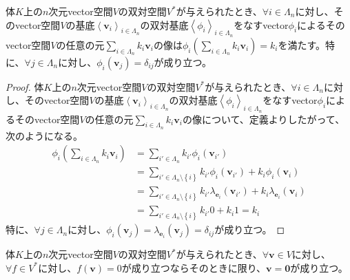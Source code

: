 \documentclass[dvipdfmx]{jsarticle}
\begin{document}
\begin{thm}\label{2.4.2.6}
体$K$上の$n$次元vector空間$V$の双対空間$V^{*}$が与えられたとき、$\forall i \in \varLambda_{n}$に対し、そのvector空間$V$の基底$\left\langle \mathbf{v}_{i} \right\rangle_{i \in \varLambda_{n}}$の双対基底$\left\langle \phi_{i} \right\rangle_{i \in \varLambda_{n}}$をなすvector$\phi_{i}$によるそのvector空間$V$の任意の元$\sum_{i \in \varLambda_{n}} {k_{i}\mathbf{v}_{i}}$の像は$\phi_{i}\left( \sum_{i \in \varLambda_{n}} {k_{i}\mathbf{v}_{i}} \right) = k_{i}$を満たす。特に、$\forall j \in \varLambda_{n}$に対し、$\phi_{i}\left( \mathbf{v}_{j} \right) = \delta_{ij}$が成り立つ。
\end{thm}
\begin{proof}
体$K$上の$n$次元vector空間$V$の双対空間$V^{*}$が与えられたとき、$\forall i \in \varLambda_{n}$に対し、そのvector空間$V$の基底$\left\langle \mathbf{v}_{i} \right\rangle_{i \in \varLambda_{n}}$の双対基底$\left\langle \phi_{i} \right\rangle_{i \in \varLambda_{n}}$をなすvector$\phi_{i}$によるそのvector空間$V$の任意の元$\sum_{i \in \varLambda_{n}} {k_{i}\mathbf{v}_{i}}$の像について、定義よりしたがって、次のようになる。
\begin{align*}
\phi_{i}\left( \sum_{i \in \varLambda_{n}} {k_{i}\mathbf{v}_{i}} \right) &= \sum_{i' \in \varLambda_{n}} {k_{i'}\phi_{i}\left( \mathbf{v}_{i'} \right)}\\
&= \sum_{i' \in \varLambda_{n} \setminus \left\{ i \right\}} {k_{i'}\phi_{i}\left( \mathbf{v}_{i'} \right)} + k_{i}\phi_{i}\left( \mathbf{v}_{i} \right)\\
&= \sum_{i' \in \varLambda_{n} \setminus \left\{ i \right\}} {k_{i'}\lambda_{\mathbf{e}_{i}}\left( \mathbf{v}_{i'} \right)} + k_{i}\lambda_{\mathbf{e}_{i}}\left( \mathbf{v}_{i} \right)\\
&= \sum_{i' \in \varLambda_{n} \setminus \left\{ i \right\}} {k_{i'}0} + k_{i}1 = k_{i}
\end{align*}
特に、$\forall j \in \varLambda_{n}$に対し、$\phi_{i}\left( \mathbf{v}_{j} \right) = \lambda_{\mathbf{e}_{i}}\left( \mathbf{v}_{j} \right) = \delta_{ij}$が成り立つ。
\end{proof}
\begin{thm}\label{2.4.2.7}
体$K$上の$n$次元vector空間$V$の双対空間$V^{*}$が与えられたとき、$\forall\mathbf{v} \in V$に対し、$\forall f \in V^{*}$に対し、$f\left( \mathbf{v} \right) = 0$が成り立つならそのときに限り、$\mathbf{v} = \mathbf{0}$が成り立つ。
\end{thm}
\end{document}
